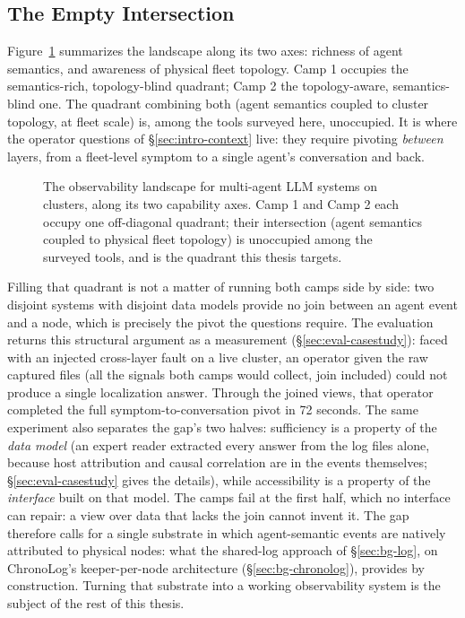 \subsection{The Empty Intersection}
\label{sec:bg-sota-gap}

Figure~\ref{fig:quadrant} summarizes the landscape along its two axes:
richness of agent semantics, and awareness of physical fleet topology. Camp
1 occupies the semantics-rich, topology-blind quadrant; Camp 2 the
topology-aware, semantics-blind one. The quadrant combining both (agent
semantics coupled to cluster topology, at fleet scale) is, among the
tools surveyed here, unoccupied. It
is where the operator questions of \S\ref{sec:intro-context} live: they
require pivoting \emph{between} layers, from a fleet-level symptom to a
single agent's conversation and back.

\begin{figure}[t]
  \centering
  
  \caption[The observability landscape and its empty quadrant]{The observability landscape for multi-agent LLM systems on
  clusters, along its two capability axes. Camp 1 and Camp 2 each occupy
  one off-diagonal quadrant; their intersection (agent semantics coupled
  to physical fleet topology) is unoccupied among the surveyed tools,
  and is the quadrant this thesis targets.}
  \label{fig:quadrant}
\end{figure}

Filling that quadrant is not a matter of running both camps side by side:
two disjoint systems with disjoint data models provide no join between an
agent event and a node, which is precisely the pivot the questions require.
The evaluation returns this structural argument as a measurement
(\S\ref{sec:eval-casestudy}): faced with an injected cross-layer fault on
a live cluster, an operator given the raw captured files (all the
signals both camps would collect, join included) could not produce a
single localization answer. Through the joined views, that operator
completed the full symptom-to-conversation pivot in 72 seconds.
The same experiment also separates the gap's two halves: sufficiency is a
property of the \emph{data model} (an expert reader extracted every
answer from the log files alone, because host attribution and causal
correlation are in the events themselves; \S\ref{sec:eval-casestudy}
gives the details), while accessibility is a property of the
\emph{interface} built on that model. The camps fail at the first half,
which no interface can repair: a view over data that lacks the join
cannot invent it.
The gap therefore calls for a single substrate in which agent-semantic
events are natively attributed to physical nodes: what the
shared-log approach of \S\ref{sec:bg-log}, on ChronoLog's
keeper-per-node architecture (\S\ref{sec:bg-chronolog}), provides by
construction. Turning that substrate into a working observability system
is the subject of the rest of this thesis.
